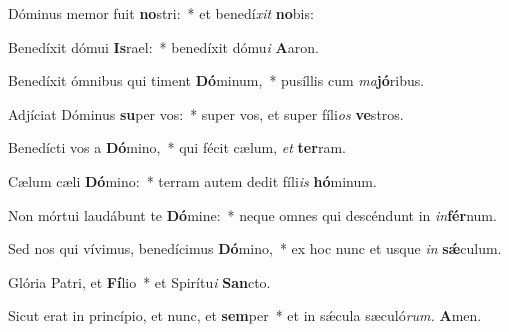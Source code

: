 \item Dóminus memor fuit \textbf{no}stri:~* et benedí\hspace{0.03em}\textit{xit} \textbf{no}bis:
\item Benedíxit dómui \textbf{Is}rael:~* benedíxit dómu\textit{i} \textbf{A}aron.
\item  Benedíxit ómnibus qui timent \textbf{Dó}minum,~* pusíllis cum \textit{ma}\textbf{jó}ribus.
\item Adjíciat Dóminus \textbf{su}per vos:~* super vos, et super fíli\textit{os} \textbf{ve}stros.
\item Benedícti vos a \textbf{Dó}mino,~* qui fécit cælum, \textit{et} \textbf{ter}ram.
\item Cælum cæli \textbf{Dó}mino:~* terram autem dedit fíli\textit{is} \textbf{hó}minum.
\item Non mórtui laudábunt te \textbf{Dó}mine:~* neque omnes qui descéndunt in \textit{in}\textbf{fér}num.
\item Sed nos qui vívimus, benedícimus \textbf{Dó}mino,~* ex hoc nunc et usque \textit{in} \textbf{sǽ}culum.
\item Glória Patri, et \textbf{Fí}lio~* et Spirítu\textit{i} \textbf{San}cto.
\item Sicut erat in princípio, et nunc, et \textbf{sem}per~* et in sǽcula sæculó\textit{rum.} \textbf{A}men.
